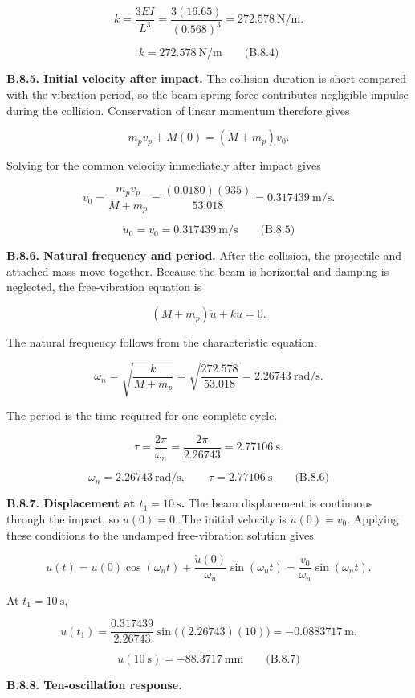 \[
k=\frac{3EI}{L^3}
 =\frac{3(16.65)}{(0.568)^3}
 =272.578\ \mathrm{N/m}.
\]

\[
\boxed{k=272.578\ \mathrm{N/m}}
\qquad\text{(B.8.4)}
\]

\textbf{B.8.5. Initial velocity after impact.} The collision duration is short compared with the vibration period, so the beam spring force contributes negligible impulse during the collision. Conservation of linear momentum therefore gives

\[
m_pv_p+M(0)=(M+m_p)v_0.
\]

Solving for the common velocity immediately after impact gives

\[
v_0=\frac{m_pv_p}{M+m_p}
 =\frac{(0.0180)(935)}{53.018}
 =0.317439\ \mathrm{m/s}.
\]

\[
\boxed{\dot{u}_0=v_0=0.317439\ \mathrm{m/s}}
\qquad\text{(B.8.5)}
\]

\textbf{B.8.6. Natural frequency and period.} After the collision, the projectile and attached mass move together. Because the beam is horizontal and damping is neglected, the free-vibration equation is

\[
(M+m_p)\ddot{u}+ku=0.
\]

The natural frequency follows from the characteristic equation.

\[
\omega_n=\sqrt{\frac{k}{M+m_p}}
 =\sqrt{\frac{272.578}{53.018}}
 =2.26743\ \mathrm{rad/s}.
\]

The period is the time required for one complete cycle.

\[
\tau=\frac{2\pi}{\omega_n}
 =\frac{2\pi}{2.26743}
 =2.77106\ \mathrm{s}.
\]

\[
\boxed{\omega_n=2.26743\ \mathrm{rad/s},
\qquad
\tau=2.77106\ \mathrm{s}}
\qquad\text{(B.8.6)}
\]

\textbf{B.8.7. Displacement at $t_1=10\ \mathrm{s}$.} The beam displacement is continuous through the impact, so $u(0)=0$. The initial velocity is $\dot{u}(0)=v_0$. Applying these conditions to the undamped free-vibration solution gives

\[
u(t)=u(0)\cos(\omega_nt)
 +\frac{\dot{u}(0)}{\omega_n}\sin(\omega_nt)
 =\frac{v_0}{\omega_n}\sin(\omega_nt).
\]

At $t_1=10\ \mathrm{s}$,

\[
u(t_1)=\frac{0.317439}{2.26743}\sin\bigl((2.26743)(10)\bigr)
 =-0.0883717\ \mathrm{m}.
\]

\[
\boxed{u(10\ \mathrm{s})=-88.3717\ \mathrm{mm}}
\qquad\text{(B.8.7)}
\]

\textbf{B.8.8. Ten-oscillation response.}


